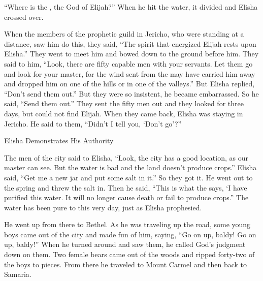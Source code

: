 {“Where
is the
{},
the God
of Elijah?” When he hit
the water,
it divided
and Elisha
crossed over.
\par }{\PP {}When
the members of the prophetic guild
in Jericho,
who
were standing at a distance,
saw him do this, they said,
“The spirit
that energized Elijah
rests
upon
Elisha.”
They went
to meet
him and bowed
down to the ground before him.
They said
to him,
“Look,
there
are fifty
capable
men
with
your servants.
Let
them go
and look
for your master,
for the wind
sent from the
{}
may have carried
him away and dropped
him on one
of the hills
or
in one
of the valleys.”
But Elisha replied,
“Don’t
send them out.”
But they were so insistent,
he became embarrassed.
So he said,
“Send
them out.” They sent
the fifty
men
out and they looked
for three
days,
but could not
find Elijah.
When they came
back,
Elisha was staying
in Jericho.
He said
to
them, “Didn’t
I tell
you, ‘Don’t
go’?”
\par }{\SH Elisha Demonstrates His Authority
\par }{\PP {}The men
of the city
said to
Elisha,
“Look,
the city
has a good
location,
as
our master
can
see.
But the water
is bad
and the land
doesn’t produce crops.”
Elisha said,
“Get
me a new
jar
and put
some
salt
in it.” So
they got it.
He went out
to
the spring
and threw
the salt
in. Then he said,
“This is what
the {}
says,
‘I have purified
this
water.
It will
no
longer
cause death
or fail to produce crops.”
The water
has been pure
to this very
day,
just
as Elisha
prophesied.
\par }{\PP {}He went up
from there
to Bethel.
As he
was traveling up
the road,
some young
boys
came out
of the city
and made fun
of him, saying,
“Go on up,
baldy! Go on up,
baldy!”
When he turned
around
and saw
them,
he called
God’s judgment
down on them. Two
female bears
came out
of the woods
and ripped
forty-two
of the boys to pieces.
From there
he traveled
to
Mount
Carmel
and then back
to Samaria.

}
